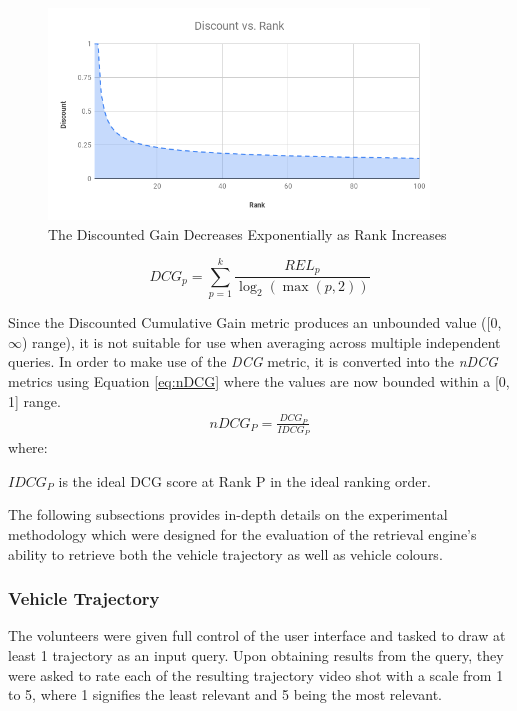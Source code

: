 \begin{figure}[!ht]
\centering
\includegraphics[width=0.9\textwidth]{image/retrievalTwo/discountvsrank.png}
\caption{The Discounted Gain Decreases Exponentially as Rank Increases}
\label{fig:dcgGain}       %
\end{figure}

\begin{equation}
\label{eq:DCGk}
DCG_p = \sum_{p=1}^k\frac{REL_{p}}{\log_2 (\max (p,2))}
\end{equation}


Since the Discounted Cumulative Gain metric produces an unbounded value ([0,
$\infty$) range), it is not suitable for use when averaging across multiple
independent queries. In order to make use of the \textit{DCG} metric, it is
converted into the \textit{nDCG} metrics using Equation \ref{eq:nDCG} where
the values are now bounded within a [0, 1] range.
\begin{align}
\label{eq:nDCG}
\textit{nDCG}_P = \frac{DCG_P}{IDCG_P}
\end{align}
where:

\hspace{2em} $IDCG_P$ is the ideal DCG score at Rank P in the ideal ranking
order.

The following subsections provides in-depth details on the experimental
methodology which were designed for the evaluation of the retrieval engine's
ability to retrieve both the vehicle trajectory as well as vehicle colours.


\subsubsection{Vehicle Trajectory}
The volunteers were given full control of the user interface and tasked to draw
at least 1 trajectory as an input query. Upon obtaining results from the query,
they were asked to rate each of the resulting trajectory video shot with a
scale from 1 to 5, where 1 signifies the least relevant and 5 being the most
relevant.

